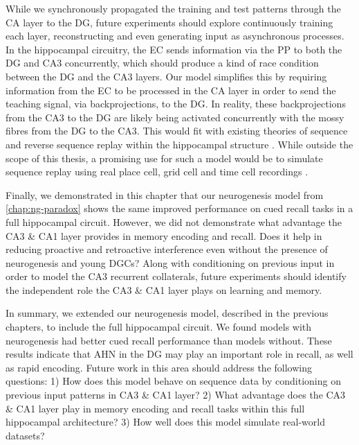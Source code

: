 While we synchronously propagated the training and test patterns 
through the CA layer to the \ac{DG}, future experiments should 
explore continuously training each layer, 
reconstructing and even generating input as asynchronous 
processes. 
In the hippocampal circuitry, the \ac{EC} sends 
information via the \ac{PP} to both the \ac{DG} and 
CA3 concurrently, which should produce a kind of race 
condition between the \ac{DG} and the CA3 layers. 
Our model simplifies this by requiring information from the \ac{EC} to 
be processed in the CA layer in order to send the teaching signal, 
via backprojections, to the \ac{DG}. 
In reality, these backprojections from the CA3 to 
the \ac{DG} are likely being activated concurrently with the mossy fibres 
from the \ac{DG} to the CA3.
This would fit with existing theories of sequence and 
reverse sequence replay within the hippocampal structure \citep{lisman-99}. 
While outside the scope of this thesis, a promising use for such a model 
would be to simulate sequence replay using real place cell, grid cell and time cell recordings 
\citep{place-cells, place-grid-cells, place-grid-models, time-cells}.

Finally, we demonstrated in this chapter that our neurogenesis model from 
\cref{chap:ng-paradox} shows the same improved performance on cued recall tasks 
in a full hippocampal circuit. 
However, we did not demonstrate what advantage the CA3 \& CA1 layer provides 
in memory encoding and recall. 
Does it help in reducing proactive and retroactive interference 
even without the presence of neurogenesis and young \acp{DGC}?
Along with conditioning on previous input in order to model the CA3 recurrent collaterals, 
future experiments should identify the independent role the 
CA3 \& CA1 layer plays on learning and memory.

In summary, we extended our neurogenesis model, described 
in the previous chapters, to include the full hippocampal
circuit. 
We found models with neurogenesis had better cued recall performance 
than models without. 
These results indicate that \ac{AHN} in the \ac{DG} may play 
an important role in recall, as well as rapid encoding. 
Future work in this area should address the following questions: 
1) How does this model behave on 
sequence data by conditioning on previous input patterns in CA3 \& CA1 layer? 
2) What advantage does the CA3 \& CA1 layer play in memory encoding and recall tasks 
within this full hippocampal architecture?
3) How well does this model simulate real-world datasets?


